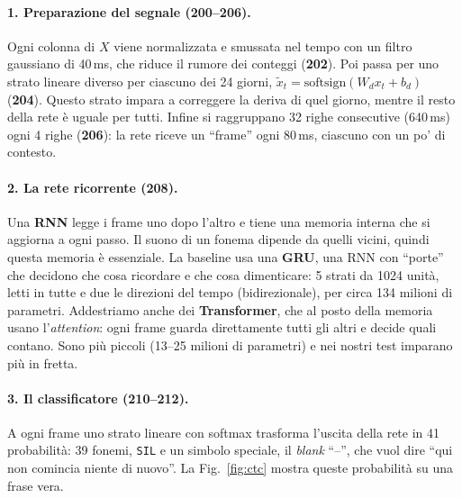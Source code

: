 \documentclass[10pt,a4paper]{article}
\begin{document}
\paragraph{1. Preparazione del segnale (200--206).} Ogni colonna di $X$ viene normalizzata e smussata nel tempo con un filtro gaussiano di 40\,ms, che riduce il rumore dei conteggi (\textbf{202}). Poi passa per uno strato lineare diverso per ciascuno dei 24 giorni, $\tilde x_t=\mathrm{softsign}(W_d x_t+b_d)$ (\textbf{204}). Questo strato impara a correggere la deriva di quel giorno, mentre il resto della rete è uguale per tutti. Infine si raggruppano 32 righe consecutive (640\,ms) ogni 4 righe (\textbf{206}): la rete riceve un ``frame'' ogni 80\,ms, ciascuno con un po' di contesto.

\paragraph{2. La rete ricorrente (208).} Una \textbf{RNN} legge i frame uno dopo l'altro e tiene una memoria interna che si aggiorna a ogni passo. Il suono di un fonema dipende da quelli vicini, quindi questa memoria è essenziale. La baseline usa una \textbf{GRU}, una RNN con ``porte'' che decidono che cosa ricordare e che cosa dimenticare: 5 strati da 1024 unità, letti in tutte e due le direzioni del tempo (bidirezionale), per circa 134 milioni di parametri. Addestriamo anche dei \textbf{Transformer}, che al posto della memoria usano l'\emph{attention}: ogni frame guarda direttamente tutti gli altri e decide quali contano. Sono più piccoli (13--25 milioni di parametri) e nei nostri test imparano più in fretta.

\paragraph{3. Il classificatore (210--212).} A ogni frame uno strato lineare con softmax trasforma l'uscita della rete in 41 probabilità: 39 fonemi, \texttt{SIL} e un simbolo speciale, il \emph{blank} ``--'', che vuol dire ``qui non comincia niente di nuovo''. La Fig.~\ref{fig:ctc} mostra queste probabilità su una frase vera.
\end{document}
